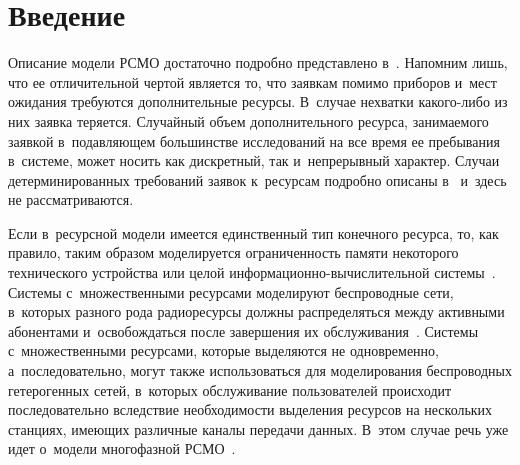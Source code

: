 
  
\vspace*{-4pt}



\thispagestyle{headings}

\begin{multicols}{2}

\label{st\stat}

\section{Введение}

Описание модели РСМО достаточно подробно 
представлено в~\cite{Ch_1}. Напомним лишь, что ее отличительной чертой является 
то, что заявкам помимо приборов и~мест ожидания требуются дополнительные 
ресурсы. В~случае нехватки ка\-ко\-го-ли\-бо из них заявка теряется.
Случайный объем дополнительного ресурса, занимаемого заявкой в~подавляющем 
большинстве исследований на все время ее пребывания в~сис\-те\-ме, может носить как 
дискретный, так и~непрерывный характер. Случаи детерминированных требований 
заявок к~ресурсам подробно описаны в~\cite{Kelly,Ross,Basharin} и~здесь не 
рассматриваются.

Если в~ресурсной модели имеется единственный тип конечного ресурса, то, как 
правило, таким образом моделируется ограниченность памяти некоторого 
технического устройства или целой ин\-фор\-ма\-ци\-он\-но-вы\-чис\-ли\-тель\-ной 
сис\-те\-мы~\cite{Romm_21_1971,Kac,Tihonenko_27_1985,Pechinkin_29_2012}. 
%
Сис\-те\-мы 
с~множественными ресурсами моделируют беспроводные сети, в~которых разного рода 
радиоресурсы должны распределяться между активными абонентами и~освобождаться 
после завершения  их обслуживания~\cite{Naumov_3_2016}.
Системы с~множественными ресурсами, которые выделяются не одновременно, 
а~последовательно, могут также использоваться для моделирования беспроводных 
гетерогенных сетей, в~которых обслуживание пользователей происходит 
последовательно вследствие необходимости выделения ресурсов на нескольких 
станциях, имеющих различные каналы передачи данных. В~этом случае речь уже идет 
о~модели многофазной РСМО~\cite{Mois_4_2017,Mois_5_2017}.



\end{multicols}
